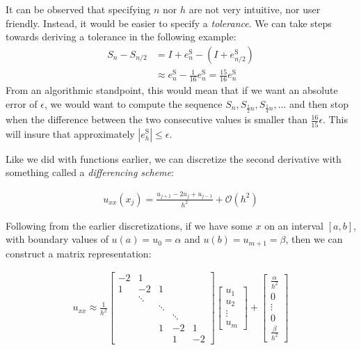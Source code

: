 \documentclass{article}
\begin{document}
 It can be observed that specifying $n$ nor $h$ are not very intuitive, nor user friendly. Instead, it would be easier to specify a \textit{tolerance}. We can take steps towards deriving a tolerance in the following example:
\begin{align*}
  S_n - S_{n/2} &= I + e_n^\text{S} - (I + e_{n/2}^\text{S})\\
                &\approx e_n^\text{S} - \frac{1}{16}e_n^\text{S} = \frac{15}{16}e_n^\text{S}
\end{align*}
From an algorithmic standpoint, this would mean that if we want an absolute error of $\epsilon$, we would want to compute the sequence $S_n, S_{\frac{1}{2}n}, S_{\frac{1}{4}n}, \ldots$ and then stop when the difference between the two consecutive values is smaller than $\frac{16}{15}\epsilon$. This will insure that approximately $|e_h^\text{S}| \leq \epsilon$.

\pagebreak


Like we did with functions earlier, we can discretize the second derivative with something called a \textit{differencing scheme}:

\begin{align*}
  u_{xx}(x_j) = \frac{u_{j + 1} - 2u_j + u_{j - 1}}{h^2} + \mathcal{O}(h^2)
\end{align*}

 Following from the earlier discretizations, if we have some $x$ on an interval $[a, b]$, with boundary values of $u(a) = u_0 = \alpha$ and $u(b) = u_{m + 1} = \beta$, then we can construct a matrix representation:

\begin{align*}
  u_{xx} \approx \frac{1}{h^2} \begin{bmatrix}
    -2 & 1 & & & \\
    1 & -2 & 1 & & \\
       & \ddots &  & & \\
       &  & \ddots &  & \\
       & &  & \ddots &  \\
       & & 1 & -2 & 1\\
       & & & 1 & -2
  \end{bmatrix}
  \begin{bmatrix}
    u_1\\
    u_2\\
    \vdots\\
    u_m
  \end{bmatrix}
  +
  \begin{bmatrix}
    \frac{\alpha}{h^2}\\
    0\\
    \vdots\\
    0\\
    \frac{\beta}{h^2}
  \end{bmatrix}
\end{align*}
\end{document}
